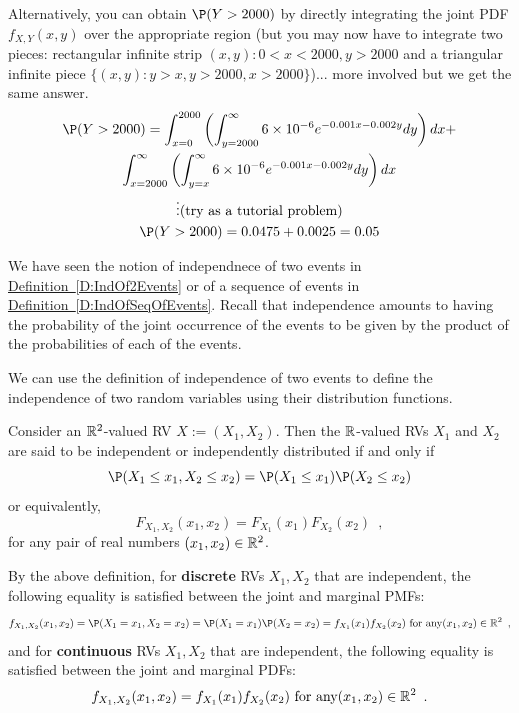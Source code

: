 \begin{example}
{\scriptsize
Alternatively, you can obtain $\P(Y>2000)$ by directly integrating the joint PDF $f_{X,Y}(x,y)$ over the appropriate region (but you may now have to integrate two pieces: rectangular infinite strip ${(x,y): 0<x<2000, y>2000}$ and a triangular infinite piece $\{(x,y): y>x, y>2000, x> 2000\}$)... more involved but we get the same answer.
\begin{multline*}
\P(Y>2000) = \int_{x=0}^{2000} \left( \int_{y=2000}^{\infty} 6 \times 10^{-6} e^{-0.001 x - 0.002y} dy \right) dx + \\
\int_{x=2000}^{\infty} \left( \int_{y=x}^{\infty} 6 \times 10^{-6} e^{-0.001 x - 0.002y} dy \right) dx 
\\
\vdots \text{(try as a tutorial problem)} \\
\P(Y>2000) = 0.0475 + 0.0025 = 0.05
\end{multline*}
}
\end{example}

We have seen the notion of independnece of two events in \hyperref[D:IndOf2Events]{Definition~\ref*{D:IndOf2Events}} or of a sequence of events in \hyperref[D:IndOfSeqOfEvents]{Definition~\ref*{D:IndOfSeqOfEvents}}. 
Recall that independence amounts to having the probability of the joint occurrence of the events to be given by the product of the probabilities of each of the events.

We can use the definition of independence of two events to define the independence of two random variables using their distribution functions.

\begin{definition}\label{D:Ind2RVs}
Consider an $\mathbb{R}^2$-valued RV $X:=(X_1,X_2)$. Then the $\mathbb{R}$-valued RVs $X_1$ and $X_2$ are said to be independent or independently distributed if and only if
\[
\P(X_{1} \leq x_{1}, X_{2} \leq x_{2} ) = \P(X_{1} \leq x_{1}) \P(X_{2} \leq x_{2})
\]
or equivalently,
\[
F_{X_{1},X_{2}}(x_{1},x_{2}) = F_{X_{1}}(x_{1}) F_{X_{2}}(x_{2}) \enspace ,
\]
for any pair of real numbers $(x_{1},x_{2}) \in \mathbb{R}^2$.

By the above definition, for {\bf discrete} RVs $X_1,X_2$ that are independent, the following equality is satisfied between the joint and marginal PMFs:
\[
f_{X_1,X_2}(x_1,x_2) = \P(X_{1}= x_{1}, X_{2} = x_{2}) = \P(X_{1} = x_{1}) \P(X_{2} = x_{2}) = f_{X_1}(x_1) f_{X_2}(x_2) \text{ for any} (x_{1},x_{2}) \in \Rz^2 \enspace ,
\]
and for {\bf continuous} RVs $X_1,X_2$ that are independent, the following equality is satisfied between the joint and marginal PDFs:
\[
f_{X_1,X_2}(x_1,x_2) = f_{X_1}(x_1) f_{X_2}(x_2)  \text{ for any} (x_{1},x_{2}) \in \mathbb{R}^2 \enspace .
\] 
\end{definition}


